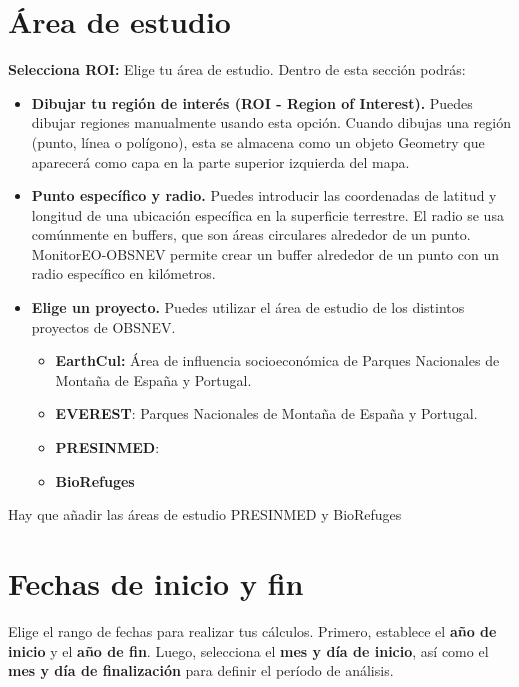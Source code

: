 \documentclass[
]{book}
\providecommand{\tightlist}{%
  \setlength{\itemsep}{0pt}\setlength{\parskip}{0pt}}
\begin{document}
\chapter{Área de estudio}\label{area-estudio}

\textbf{Selecciona ROI:} Elige tu área de estudio. Dentro de esta sección podrás:

\begin{itemize}
\tightlist
\item
  \textbf{Dibujar tu región de interés (ROI - Region of Interest).} Puedes dibujar regiones manualmente usando esta opción. Cuando dibujas una región (punto, línea o polígono), esta se almacena como un objeto Geometry que aparecerá como capa en la parte superior izquierda del mapa.\\
\item
  \textbf{Punto específico y radio.} Puedes introducir las coordenadas de latitud y longitud de una ubicación específica en la superficie terrestre. El radio se usa comúnmente en buffers, que son áreas circulares alrededor de un punto. MonitorEO-OBSNEV permite crear un buffer alrededor de un punto con un radio específico en kilómetros.\\
\item
  \textbf{Elige un proyecto.} Puedes utilizar el área de estudio de los distintos proyectos de OBSNEV.

  \begin{itemize}
  \tightlist
  \item
    \textbf{EarthCul:} Área de influencia socioeconómica de Parques Nacionales de Montaña de España y Portugal.\\
  \item
    \textbf{EVEREST}: Parques Nacionales de Montaña de España y Portugal.\\
  \item
    \textbf{PRESINMED}:\\
  \item
    \textbf{BioRefuges}
  \end{itemize}
\end{itemize}

Hay que añadir las áreas de estudio PRESINMED y BioRefuges

\chapter{Fechas de inicio y fin}\label{fechas}

Elige el rango de fechas para realizar tus cálculos. Primero, establece el \textbf{año de inicio} y el \textbf{año de fin}. Luego, selecciona el \textbf{mes y día de inicio}, así como el \textbf{mes y día de finalización} para definir el período de análisis.
\end{document}
